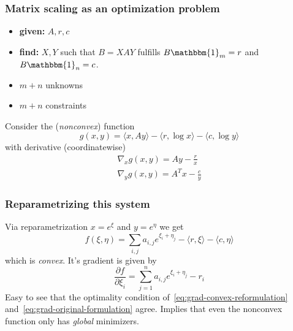 \documentclass{beamer}
\begin{document}
\begin{frame}
  \frametitle{Matrix scaling as an optimization problem}
  \begin{itemize}
    \item \textbf{given:} $A, r, c$
    \item \textbf{find:} $X, Y$ such that $B=XAY$ fulfills $B\mathbbm{1}_m=r$ and $B \mathbbm{1}_n=c$.
    \item $m+n$ unknowns
          \item $m+n$ constraints
  \end{itemize}
  Consider the (\emph{nonconvex}) function
  \begin{equation}
    g(x,y) = \langle x, A y \rangle - \langle r, \log x \rangle - \langle c, \log y \rangle
  \end{equation}
  with derivative (coordinatewise)
  \begin{equation}
    \label{eq:grad-original-formulation}
    \begin{aligned}
      \nabla_x g(x,y) = Ay - \frac{r}{x} \\
      \nabla_y g(x,y) = A^T x - \frac{c}{y}
    \end{aligned}
  \end{equation}
\end{frame}


\begin{frame}
  \frametitle{Reparametrizing this system}
  Via reparametrization $x= e^\xi$ and $y=e^{\eta}$ we get
  \begin{equation}
    f(\xi, \eta) = \sum_{i,j} a_{i,j} e^{\xi_i + \eta_j} - \langle r, \xi \rangle - \langle c, \eta \rangle
  \end{equation}
  which is \emph{convex}. It's gradient is given by
  \begin{equation}
    \label{eq:grad-convex-reformulation}
    \frac{\partial f}{\partial \xi_i} = \sum_{j=1}^{n} a_{i,j} e^{\xi_i + \eta_j} - r_i
  \end{equation}
  Easy to see that the optimality condition of~\eqref{eq:grad-convex-reformulation} and~\eqref{eq:grad-original-formulation} agree.
  Implies that even the nonconvex function only has \emph{global} minimizers.
\end{frame}
\end{document}
